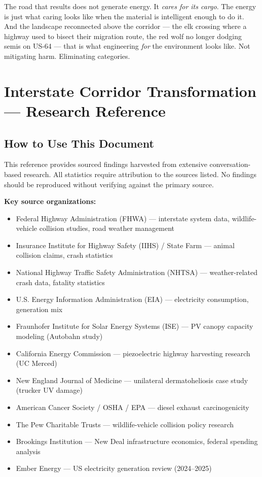 \documentclass[11pt,letterpaper]{article}
\newcommand{\stageheader}[2]{%
  \noindent\colorbox{#2}{\makebox[\textwidth][l]{%
    \textcolor{white}{\bfseries\sffamily\hspace{6pt}#1\hspace{6pt}}}}%
  \vspace{0.5em}\par%
}
\begin{document}
The road that results does not generate energy. It \textit{cares for its cargo}. The energy is just what caring looks like when the material is intelligent enough to do it. And the landscape reconnected above the corridor --- the elk crossing where a highway used to bisect their migration route, the red wolf no longer dodging semis on US-64 --- that is what engineering \textit{for} the environment looks like. Not mitigating harm. Eliminating categories.

\newpage

\stageheader{STAGE 2 --- RESEARCH REFERENCE}{secondary}

\section{Interstate Corridor Transformation --- Research Reference}

\subsection{How to Use This Document}

This reference provides sourced findings harvested from extensive conversation-based research. All statistics require attribution to the sources listed. No findings should be reproduced without verifying against the primary source.

\textbf{Key source organizations:}
\begin{itemize}
  \item Federal Highway Administration (FHWA) --- interstate system data, wildlife-vehicle collision studies, road weather management
  \item Insurance Institute for Highway Safety (IIHS) / State Farm --- animal collision claims, crash statistics
  \item National Highway Traffic Safety Administration (NHTSA) --- weather-related crash data, fatality statistics
  \item U.S. Energy Information Administration (EIA) --- electricity consumption, generation mix
  \item Fraunhofer Institute for Solar Energy Systems (ISE) --- PV canopy capacity modeling (Autobahn study)
  \item California Energy Commission --- piezoelectric highway harvesting research (UC Merced)
  \item New England Journal of Medicine --- unilateral dermatoheliosis case study (trucker UV damage)
  \item American Cancer Society / OSHA / EPA --- diesel exhaust carcinogenicity
  \item The Pew Charitable Trusts --- wildlife-vehicle collision policy research
  \item Brookings Institution --- New Deal infrastructure economics, federal spending analysis
  \item Ember Energy --- US electricity generation review (2024--2025)
\end{itemize}
\end{document}
